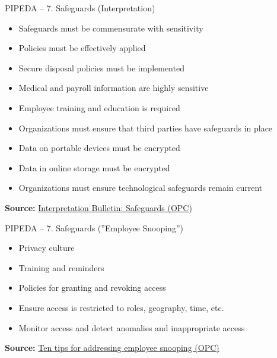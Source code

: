 \documentclass[ignorenonframetext,xcolor=x11names]{beamer}
\begin{document}
\begin{frame}[label=full]{PIPEDA -- 7. Safeguards \small (Interpretation)}
\begin{itemize}
   \item Safeguards must be commensurate with sensitivity
   \item Policies must be effectively applied
   \item Secure disposal policies must be implemented
   \item Medical and payroll information are highly sensitive
   \item Employee training and education is required
   \item Organizations must ensure that third parties have safeguards in place
   \item Data on portable devices must be encrypted
   \item Data in online storage must be encrypted
   \item Organizations must ensure technological safeguards remain current
\end{itemize}

\vspace{\baselineskip}
\scriptsize \textbf{Source:} \href{https://www.priv.gc.ca/en/privacy-topics/privacy-laws-in-canada/the-personal-information-protection-and-electronic-documents-act-pipeda/pipeda-compliance-help/pipeda-interpretation-bulletins/interpretations_08_sg/}{Interpretation Bulletin: Safeguards (OPC)}
\end{frame}

\begin{frame}[label=full]{PIPEDA -- 7. Safeguards \small (''Employee Snooping'')}
\begin{itemize}
   \item Privacy culture
   \item Training and reminders
   \item Policies for granting and revoking access
   \item Ensure access is restricted to roles, geography, time, etc.
   \item Monitor access and detect anomalies and inappropriate access
\end{itemize}

\vspace{\baselineskip}
\scriptsize \textbf{Source:} \href{https://www.priv.gc.ca/en/privacy-topics/business-privacy/safeguards-and-breaches/privacy-breaches/02_05_d_65_tips/}{Ten tips for addressing employee snooping (OPC)}
\end{frame}
\end{document}
